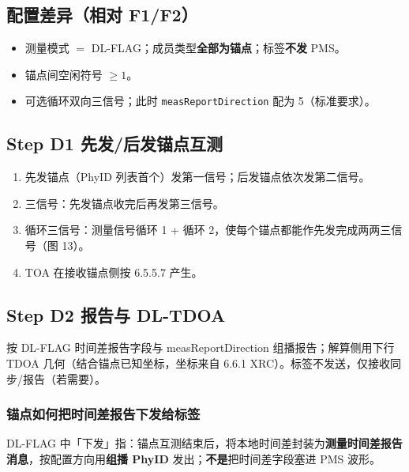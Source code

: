 \documentclass[11pt,a4paper]{ctexart}
\begin{document}
\subsection{配置差异（相对 F1/F2）}

\begin{itemize}[nosep]
  \item 测量模式 $=$ DL-FLAG；成员类型\textbf{全部为锚点}；标签\textbf{不发} PMS。
  \item 锚点间空闲符号 $\ge 1$。
  \item 可选循环双向三信号；此时 \texttt{measReportDirection} 配为 5（标准要求）。
\end{itemize}

\subsection{Step D1 先发/后发锚点互测}

\begin{enumerate}
  \item 先发锚点（PhyID 列表首个）发第一信号；后发锚点依次发第二信号。
  \item 三信号：先发锚点收完后再发第三信号。
  \item 循环三信号：测量信号循环 1 + 循环 2，使每个锚点都能作先发完成两两三信号（图 13）。
  \item TOA 在接收锚点侧按 6.5.5.7 产生。
\end{enumerate}

\subsection{Step D2 报告与 DL-TDOA}

按 DL-FLAG 时间差报告字段与 measReportDirection 组播报告；解算侧用下行 TDOA 几何（结合锚点已知坐标，坐标来自 6.6.1 XRC）。标签不发送，仅接收同步/报告（若需要）。

\subsubsection{锚点如何把时间差报告下发给标签}

DL-FLAG 中「下发」指：锚点互测结束后，将本地时间差封装为\textbf{测量时间差报告消息}，按配置方向用\textbf{组播 PhyID} 发出；\textbf{不是}把时间差字段塞进 PMS 波形。
\end{document}
